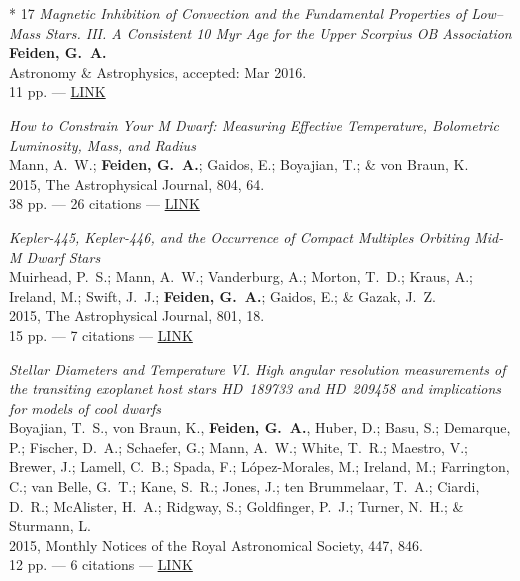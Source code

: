 \documentclass[12pt,letter]{article}
\begin{document}
\begin{etaremune}[leftmargin=0.30in]

	\item[* 17] \emph{Magnetic Inhibition of Convection and the Fundamental Properties of Low--Mass Stars. III. A Consistent 10 Myr Age for the Upper Scorpius OB Association} \\
		{\bf Feiden, G.~A.} \\
		Astronomy \& Astrophysics, accepted: Mar 2016. \\
		11 pp. --- \href{http://}{LINK}
		
	\item \emph{How to Constrain Your M Dwarf: Measuring Effective Temperature, Bolometric Luminosity, Mass, and Radius} \\
		Mann, A.~W.; {\bf Feiden, G.~A.}; Gaidos, E.; Boyajian, T.; \& von Braun, K. \\
		2015, The Astrophysical Journal, 804, 64. \\
		38 pp. --- 26 citations --- \href{http://adsabs.harvard.edu/abs/2015ApJ...804...64M}{LINK}
		
	\item \emph{Kepler-445, Kepler-446, and the Occurrence of Compact Multiples Orbiting Mid-M Dwarf Stars} \\
		Muirhead, P.~S.; Mann, A.~W.; Vanderburg, A.; Morton, T.~D.; Kraus, A.; Ireland, M.; Swift, J.~J.; {\bf Feiden, G.~A.}; Gaidos, E.; \& Gazak, J.~Z. \\ 
		2015, The Astrophysical Journal, 801, 18. \\
		15 pp. --- 7 citations --- \href{http://adsabs.harvard.edu/abs/2015ApJ...801...18M}{LINK}
	
	\item \emph{Stellar Diameters and Temperature VI. High angular resolution measurements of the transiting exoplanet host stars HD~189733 and HD~209458 and implications for models of cool dwarfs} \\
		Boyajian, T.~S., von Braun, K., {\bf Feiden, G.~A.}, Huber, D.; Basu, S.; Demarque, P.; Fischer, D.~A.; Schaefer, G.; Mann, A.~W.; White, T.~R.; Maestro, V.; Brewer, J.; Lamell, C.~B.; Spada, F.; L\'{o}pez-Morales, M.; Ireland, M.; Farrington, C.; van Belle, G.~T.; Kane, S.~R.; Jones, J.; ten Brummelaar, T.~A.; Ciardi, D.~R.; McAlister, H.~A.; Ridgway, S.; Goldfinger, P.~J.; Turner, N.~H.; \& Sturmann, L. \\
		2015, Monthly Notices of the Royal Astronomical Society, 447, 846. \\
		12 pp. --- 6 citations --- \href{http://adsabs.harvard.edu/abs/2015MNRAS.447..846B}{LINK}


\end{etaremune}
\end{document}
